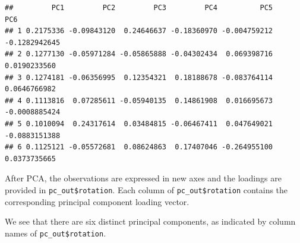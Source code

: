 \documentclass[
]{book}
\newenvironment{Shaded}{\begin{snugshade}}{\end{snugshade}}
\newcommand{\FunctionTok}[1]{\textcolor[rgb]{0.13,0.29,0.53}{\textbf{#1}}}
\newcommand{\NormalTok}[1]{#1}
\newcommand{\SpecialCharTok}[1]{\textcolor[rgb]{0.81,0.36,0.00}{\textbf{#1}}}
\begin{document}
\begin{Shaded}
\end{Shaded}

\begin{verbatim}
##         PC1         PC2         PC3         PC4          PC5           PC6
## 1 0.2175336 -0.09843120  0.24646637 -0.18360970 -0.004759212 -0.1282942645
## 2 0.1277130 -0.05971284 -0.05865888 -0.04302434  0.069398716  0.0190233560
## 3 0.1274181 -0.06356995  0.12354321  0.18188678 -0.083764114  0.0646766982
## 4 0.1113816  0.07285611 -0.05940135  0.14861908  0.016695673 -0.0008885424
## 5 0.1010094  0.24317614  0.03484815 -0.06467411  0.047649021 -0.0883151388
## 6 0.1125121 -0.05572681  0.08624863  0.17407046 -0.264955100  0.0373735665
\end{verbatim}

After PCA, the observations are expressed in new axes and the loadings are provided in \texttt{pc\_out\$rotation}. Each column of \texttt{pc\_out\$rotation} contains the corresponding principal component loading vector.

We see that there are six distinct principal components, as indicated by column names of \texttt{pc\_out\$rotation}.

\begin{Shaded}
\end{Shaded}
\end{document}
